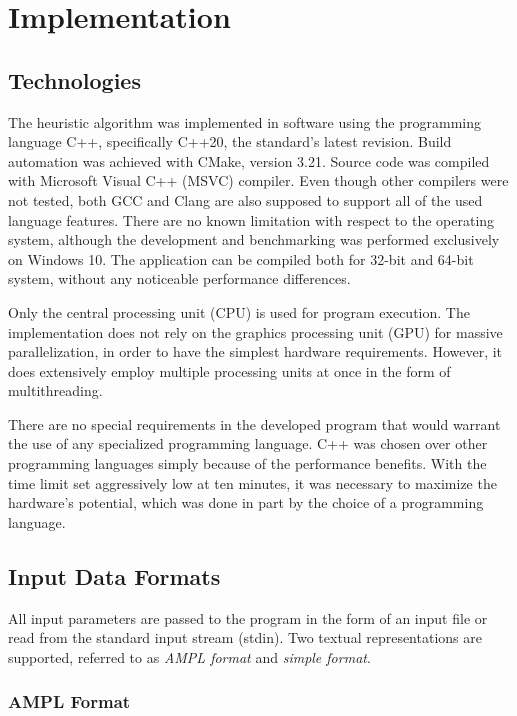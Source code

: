 \chapter{Implementation}

\section{Technologies}

The heuristic algorithm was implemented in software using the programming language C++, specifically C++20, the standard's latest revision.
Build automation was achieved with CMake, version 3.21.
Source code was compiled with Microsoft Visual C++ (MSVC) compiler.
Even though other compilers were not tested, both GCC and Clang are also supposed to support all of the used language features.
There are no known limitation with respect to the operating system, although the development and benchmarking was performed exclusively on Windows 10.
The application can be compiled both for 32-bit and 64-bit system, without any noticeable performance differences.

Only the central processing unit (CPU) is used for program execution.
The implementation does not rely on the graphics processing unit (GPU) for massive parallelization, in order to have the simplest hardware requirements.
However, it does extensively employ multiple processing units at once in the form of multithreading.

There are no special requirements in the developed program that would warrant the use of any specialized programming language.
C++ was chosen over other programming languages simply because of the performance benefits.
With the time limit set aggressively low at ten minutes, it was necessary to maximize the hardware's potential, which was done in part by the choice of a programming language.


\section{Input Data Formats}

All input parameters are passed to the program in the form of an input file or read from the standard input stream (stdin).
Two textual representations are supported, referred to as \textit{AMPL format} and \textit{simple format}.


\subsection{AMPL Format}

